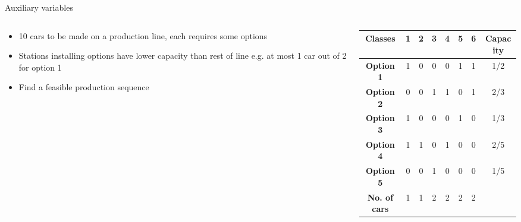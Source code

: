 \documentclass{cons-beamer}
\begin{document}
\begin{frame}{Auxiliary variables}
  \begin{example}
    \begin{columns}
      \begin{column}{0.35\textwidth}
        \begin{itemize}
          \item 10 cars to be made on a production line, each requires some options
          \item Stations installing options have lower capacity than rest of line e.g. at most 1 car out of 2 for option 1
          \item Find a feasible production sequence
        \end{itemize}
      \end{column}
      \begin{column}{0.6\textwidth}
        \begin{center}
          \begin{tabular}{|c|c|c|c|c|c|c|c|}
            \hline
            \textbf{Classes} & \textbf{1} & \textbf{2} & \textbf{3} & \textbf{4} & \textbf{5} & \textbf{6} & \textbf{Capacity} \\
            \hline
            \textbf{Option 1} & 1 & 0 & 0 & 0 & 1 & 1 & 1/2 \\
            \hline
            \textbf{Option 2} & 0 & 0 & 1 & 1 & 0 & 1 & 2/3 \\
            \hline
            \textbf{Option 3} & 1 & 0 & 0 & 0 & 1 & 0 & 1/3 \\
            \hline
            \textbf{Option 4} & 1 & 1 & 0 & 1 & 0 & 0 & 2/5 \\
            \hline
            \textbf{Option 5} & 0 & 0 & 1 & 0 & 0 & 0 & 1/5 \\
            \hline
            \textbf{No. of cars} & 1 & 1 & 2 & 2 & 2 & 2 & \\
            \hline
          \end{tabular}
        \end{center}
      \end{column}    
    \end{columns}
  \end{example}
\end{frame}
\end{document}
